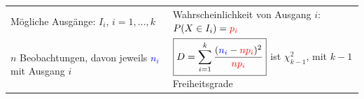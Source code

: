 		\begin{tabular}{l l}
			Mögliche Ausgänge: $I_i$, $i=1,\ldots,k$&
			Wahrscheinlichkeit von Ausgang $i$: $P(X\in I_i)=\textcolor{red}{p_i}$\\
			$n$ Beobachtungen, davon jeweils \textcolor{blue}{$n_i$} mit Ausgang $i$ &
			$\boxed{D=\sum\limits_{i=1}^{k}\frac{(\textcolor{blue}{n_i}-\textcolor{red}{np_i})^2}{\textcolor{red}{np_i}}}$ \hspace{4mm} ist $\chi^2_{k-1}$, mit $k-1$ Freiheitsgrade\\
		\end{tabular}
        

